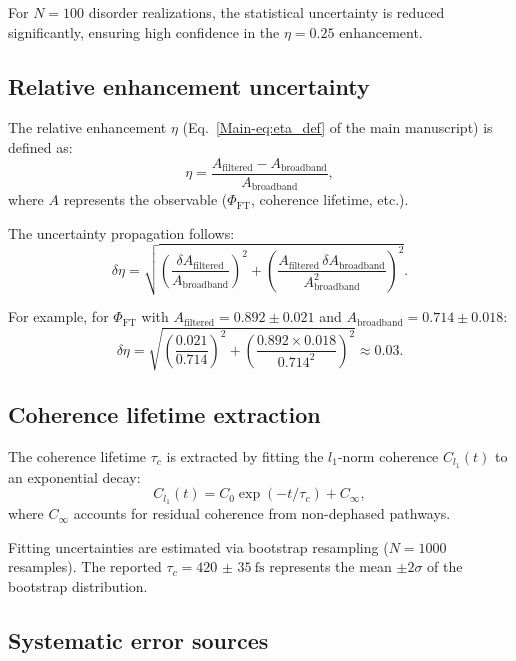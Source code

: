 \documentclass[11pt,a4paper]{article}
\begin{document}
For $N = 100$ disorder realizations, the statistical uncertainty is reduced significantly, ensuring high confidence in the $\eta = 0.25$ enhancement.

\subsection{Relative enhancement uncertainty}

The relative enhancement $\eta$ (Eq.~\cref{Main-eq:eta_def} of the main manuscript) is defined as:
\begin{equation}
\eta = \frac{A_{\mathrm{filtered}} - A_{\mathrm{broadband}}}{A_{\mathrm{broadband}}},
\end{equation}
where $A$ represents the observable ($\Phi_{\mathrm{FT}}$, coherence lifetime, etc.).

The uncertainty propagation follows:
\begin{equation}
\delta\eta = \sqrt{\left(\frac{\delta A_{\mathrm{filtered}}}{A_{\mathrm{broadband}}}\right)^2 + \left(\frac{A_{\mathrm{filtered}} \, \delta A_{\mathrm{broadband}}}{A_{\mathrm{broadband}}^2}\right)^2}.
\label{eq:error_propagation}
\end{equation}

For example, for $\Phi_{\mathrm{FT}}$ with $A_{\mathrm{filtered}} = 0.892 \pm 0.021$ and $A_{\mathrm{broadband}} = 0.714 \pm 0.018$:
\begin{equation}
\delta\eta = \sqrt{\left(\frac{0.021}{0.714}\right)^2 + \left(\frac{0.892 \times 0.018}{0.714^2}\right)^2} \approx 0.03.
\end{equation}

\subsection{Coherence lifetime extraction}

The coherence lifetime $\tau_c$ is extracted by fitting the $l_1$-norm coherence $C_{l_1}(t)$ to an exponential decay:
\begin{equation}
C_{l_1}(t) = C_0 \exp(-t/\tau_c) + C_{\infty},
\label{eq:coherence_fit}
\end{equation}
where $C_{\infty}$ accounts for residual coherence from non-dephased pathways.

Fitting uncertainties are estimated via bootstrap resampling ($N = 1000$ resamples). The reported $\tau_c = \SI{420(35)}{\femto\second}$ represents the mean $\pm 2\sigma$ of the bootstrap distribution.

\subsection{Systematic error sources}
\end{document}
